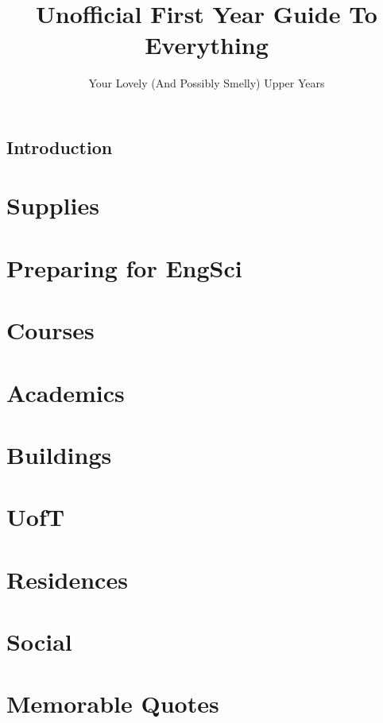 \documentclass[12pt]{report}
\author{Your Lovely (And Possibly Smelly) Upper Years}
\title{Unofficial First Year Guide To Everything}
\begin{document}
\maketitle
\tableofcontents

\section{Introduction}

\chapter{Supplies}


\chapter{Preparing for EngSci}


\chapter{Courses}


\chapter{Academics}


\chapter{Buildings}


\chapter{UofT}


\chapter{Residences}


\chapter{Social}


\chapter{Memorable Quotes}

\end{document}

